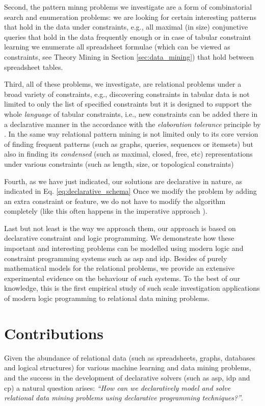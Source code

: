 Second, the pattern minng problems we investigate are a form of combinatorial search and
enumeration problems: we are looking for certain interesting patterns that hold in the data under constraints, e.g., all maximal
(in size) conjunctive queries that hold in the data frequently enough
or in case of tabular constraint learning we enumerate all spreadsheet
formulae (which can be viewed as constraints, see Theory Mining in
Section \ref{sec:data_mining}) that hold between
spreadsheet tables.


Third, all of these problems, we investigate, are relational problems under a
broad variety of constraints, e.g., discovering constraints in tabular
data is not limited to only the list of specified constraints but it
is designed to support the whole \textit{language} of tabular
constraints, i.e., new constraints can be added there in a declarative
manner in the accordance with the \textit{elaboration tolerance}
principle by \textcite{elaboration_tolerance}. In the same way
relational pattern mining is not limited only to its core version of
finding frequent patterns (such as graphs, queries, sequences or
itemsets) but also in finding its \textit{condensed} (such as maximal,
closed, free, etc) representations
under various constraints (such as length, size, or topological
constraints)

Fourth, as we have just indicated, our solutions are declarative in
nature, as indicated in Eq. \ref{eq:declarative_schema} Once we modify
the problem by adding an extra constraint or feature, we do not have
to modify the algorithm completely (like this often happens in the imperative approach \parencite{gspan,clospan}).

Last but not least is the way we approach them, our approach is based
on declarative constraint and logic programming. We demonstrate how
these important and interesting problems can be modelled using modern
logic and constraint programming systems such as \acrshort{asp} and \acrshort{idp}. Besides of purely mathematical models for the relational problems, we provide an extensive experimental evidence on the behaviour of such systems. To the best of our knowledge, this is the first empirical study of such scale investigation applications of modern logic programming to relational data mining problems.
\pubrevend

\section{Contributions}\label{sec:contributions}
Given the abundance of relational data (such as spreadsheets, graphs,
databases and logical structures) for various machine learning and data
mining problems, and the success in the development of declarative solvers (such
as \acrshort{asp}, \acrshort{idp} and \acrshort{cp}) a
natural question arises: \textit{``How can we declaratively model and
solve relational data mining problems using declarative programming
techniques?''}. 

